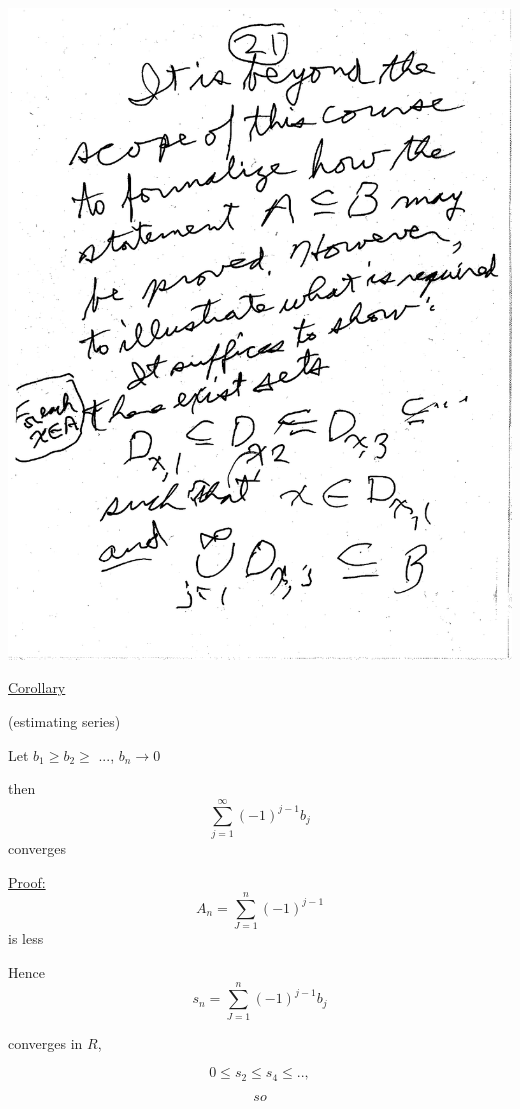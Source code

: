 \documentclass[10pt,a4paper]{article}
\begin{document}
{{\includegraphics[scale=.5]{Pages/ST_21}







 
\newpage 

\huge \underline{Corollary}

\large(estimating series)

\normalsize Let $b_1 \geq b_2 \geq$ ...,  $b_n \rightarrow 0$ 

then $$\sum_{j=1}^{\infty}(-1)^{j-1} b_j $$converges 

\underline{Proof:} $$A_n = \sum^n_{J=1}(-1)^{j-1}$$ is less 

Hence $$s_n = \sum^n_{J=1}(-1)^{j-1}b_j$$

converges in $R$,


$$0 \leq s_2 \leq s_4 \leq ..,$$

$$so$$ 

}}
\end{document}
